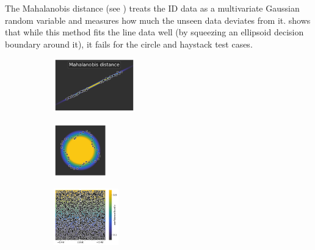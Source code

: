 The Mahalanobis distance (see ) treats the ID data as a multivariate Gaussian random variable and measures how much the unseen data deviates from it.  shows that while this method fits the line data well (by squeezing an ellipsoid decision boundary around it), it fails for the circle and haystack test cases.

\begin{figure}[H]
    \centering
    \begin{subfigure}
        \centering
        \includegraphics[width=0.388\textwidth,valign=t]{ood-detection/figures/ood-detection/confidence-line-mahalanobis.pdf}
    \end{subfigure}
    \begin{subfigure}
        \centering
        \includegraphics[width=0.254\textwidth,valign=t]{ood-detection/figures/ood-detection/confidence-circle-mahalanobis.pdf}
    \end{subfigure}
    \begin{subfigure}
        \centering
        \includegraphics[width=0.308\textwidth,valign=t]{ood-detection/figures/ood-detection/confidence-haystack-mahalanobis.pdf}
    \end{subfigure}


\end{figure}
